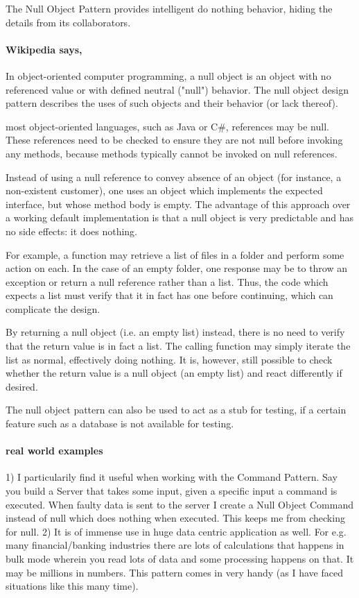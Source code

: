 \documentclass{book}
\begin{document}
    The Null Object Pattern provides intelligent do nothing behavior, hiding the details from its collaborators.

\paragraph{Wikipedia says,} In object-oriented computer programming, a null object is an object with no referenced value or with defined neutral ("null") behavior.
The null object design pattern describes the uses of such objects and their behavior (or lack thereof).

 most object-oriented languages, such as Java or C\#, references may be null.
 These references need to be checked to ensure they are not null before invoking any methods, because methods typically cannot be invoked on null references.

Instead of using a null reference to convey absence of an object (for instance, a non-existent customer), one uses an object which implements the expected interface, but whose method body is empty.
The advantage of this approach over a working default implementation is that a null object is very predictable and has no side effects: it does nothing.

For example, a function may retrieve a list of files in a folder and perform some action on each.
In the case of an empty folder, one response may be to throw an exception or return a null reference rather than a list.
Thus, the code which expects a list must verify that it in fact has one before continuing, which can complicate the design.

By returning a null object (i.e. an empty list) instead, there is no need to verify that the return value is in fact a list.
The calling function may simply iterate the list as normal, effectively doing nothing.
It is, however, still possible to check whether the return value is a null object (an empty list) and react differently if desired.

The null object pattern can also be used to act as a stub for testing, if a certain feature such as a database is not available for testing.
\paragraph{real world examples} 1)  I particularily find it useful when working with the Command Pattern.
Say you build a Server that takes some input, given a specific input a command is executed.
When faulty data is sent to the server I create a Null Object Command instead of null which does nothing when executed. This keeps me from checking for null.
2) It is of immense use in huge data centric application as well.
For e.g. many financial/banking industries there are lots of calculations that happens in bulk mode wherein you read lots of data and some processing happens on that.
It may be millions in numbers.  This pattern comes in very handy (as I have faced situations like this many time).  
\end{document}
